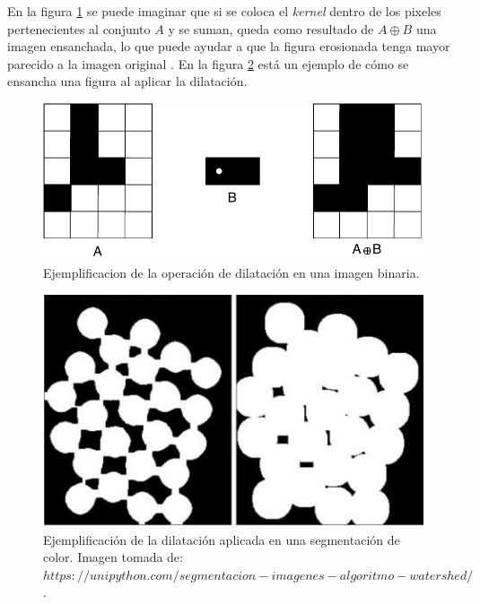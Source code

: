 En la figura \ref{fig:dilation_diagram} se puede imaginar que si se coloca el \textit{kernel} dentro de los pixeles pertenecientes al conjunto $A$ y se suman, queda como resultado de $A \oplus B$ una imagen ensanchada, lo que puede ayudar a que la figura erosionada tenga mayor parecido a la imagen original \cite{4767941}. En la figura \ref{fig:dilation_example} está un ejemplo de cómo se ensancha una figura al aplicar la dilatación.

\begin{figure}
\centering
\includegraphics[scale=1]{images/dilation_diagram.pdf}
\caption{Ejemplificacion de la operación de dilatación en una imagen binaria.}
\label{fig:dilation_diagram}
\end{figure}

\begin{figure}
\centering
\includegraphics[scale=0.7]{images/dilation_example.jpg}
\caption{Ejemplificación de la dilatación aplicada en una segmentación de color. Imagen tomada de: $https://unipython.com/segmentacion-imagenes-algoritmo-watershed/$ .}
\label{fig:dilation_example}
\end{figure}